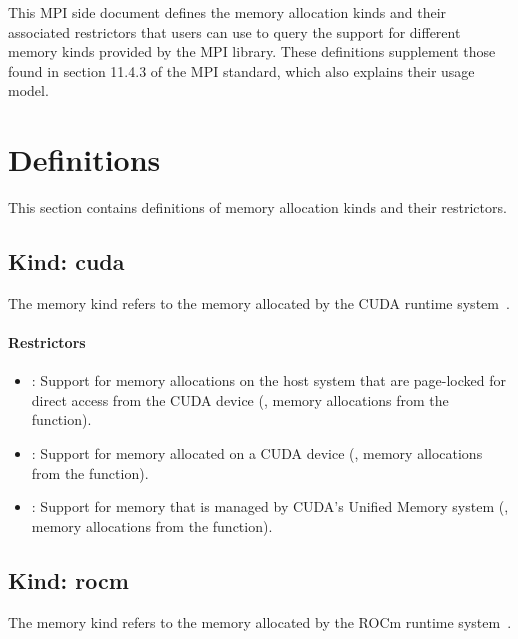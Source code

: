 This MPI side document defines the memory allocation kinds and their
associated restrictors that users can use to query the support for
different memory kinds provided by the MPI library. These definitions
supplement those found in section 11.4.3 of the MPI standard, which
also explains their usage model. 

\chapter{Definitions}

This section contains definitions of memory allocation kinds and
their restrictors.

\section{Kind: cuda}

The  memory kind refers to the memory allocated by the
CUDA runtime system~\cite{cudaref}.

\subsubsection{Restrictors}

\begin{itemize}

\item {}: Support for memory allocations on the host system
    that are page-locked for direct access from the CUDA device (\eg,
        memory allocations from the  function).

\item {}: Support for memory allocated on a CUDA device
    (\eg, memory allocations from the  function).

\item {}: Support for memory that is managed by CUDA’s
    Unified Memory system (\eg, memory allocations from the
         function).

\end{itemize}

\section{Kind: rocm}

The  memory kind refers to the memory allocated by the ROCm
runtime system~\cite{rocmref}.


